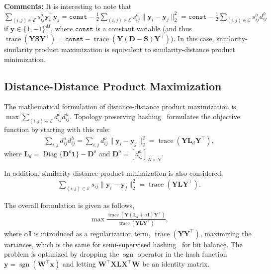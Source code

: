 \documentclass[10pt,journal,compsoc]{IEEEtran}
\begin{document}
\textbf{Comments:}
It is interesting to note that
$\sum_{(i,j) \in \mathcal{E}}s^o_{ij} \mathbf{y}_i^\top\mathbf{y}_j =
\texttt{const} - \frac{1}{2}\sum_{(i,j) \in \mathcal{E}}s^o_{ij} \|\mathbf{y}_i - \mathbf{y}_j\|_2^2
= \texttt{const} - \frac{1}{2}\sum_{(i,j) \in \mathcal{E}}s^o_{ij} d_{ij}^h$
if $\mathbf{y} \in \{1, -1\}^M$,
where $\texttt{const}$ is a constant variable
(and thus $\operatorname{trace}(\mathbf{Y}\mathbf{S}\mathbf{Y}^\top)
= \texttt{const} - \operatorname{trace}(\mathbf{Y}(\mathbf{D} - \mathbf{S})\mathbf{Y}^\top)$).
In this case,
similarity-similarity product maximization
is equivalent to
similarity-distance product minimization.



\subsection{Distance-Distance Product Maximization}
The mathematical formulation
of distance-distance product maximization
is $\operatorname{max}\sum_{(i,j)\in \mathcal{E}}d_{ij}^od_{ij}^h$.
Topology preserving hashing~\cite{ZhangZTGLT13} formulates the objective function
by starting with this rule:
\begin{align}
\sum\nolimits_{i,j}d^o_{ij}d^h_{ij}
= \sum\nolimits_{i,j}d^o_{ij}\|\mathbf{y}_i - \mathbf{y}_j\|_2^2
= \operatorname{trace}(\mathbf{Y}\mathbf{L}_d\mathbf{Y}^\top),
\end{align}
where $\mathbf{L}_d = \operatorname{Diag}\{\mathbf{D}^o\mathbf{1}\} - \mathbf{D}^o$
and $\mathbf{D}^o = [d^o_{ij}]_{N \times N }$.

In addition,
similarity-distance product minimization is also considered:
\begin{align}
\sum\nolimits_{(i,j) \in \mathcal{E} }s_{ij} \|\mathbf{y}_i - \mathbf{y}_j\|_2^2
=\operatorname{trace}(\mathbf{Y}\mathbf{L}\mathbf{Y}^\top).
\end{align}

The overall formulation is given as follows,
\begin{align}
\max \frac{\operatorname{trace}(\mathbf{Y}(\mathbf{L}_d + \alpha \mathbf{I})\mathbf{Y}^\top)}
{\operatorname{trace}(\mathbf{Y}\mathbf{L}\mathbf{Y}^\top)},
\end{align}
where $\alpha\mathbf{I}$ is introduced as a regularization term,
$\operatorname{trace}(\mathbf{Y}\mathbf{Y}^\top)$,
maximizing the variances,
which is the same for semi-supervised hashing~\cite{WangKC10a}
for bit balance.
The problem is optimized by dropping the $\operatorname{sgn}$ operator
in the hash function $\mathbf{y} = \operatorname{sgn}(\mathbf{W}^\top\mathbf{x})$
and
letting $\mathbf{W}^\top\mathbf{X}\mathbf{L}\mathbf{X}^\top\mathbf{W}$ be an identity matrix.
\end{document}
